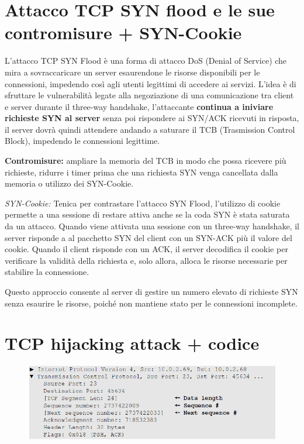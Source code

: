 \documentclass{report}
\begin{document}
\section{Attacco TCP SYN flood e le sue contromisure + SYN-Cookie}
\noindent L'attacco TCP SYN Flood è una forma di attacco DoS (Denial of Service) che mira a sovraccaricare un server esaurendone le risorse disponibili per le connessioni, impedendo così agli utenti legittimi di accedere ai servizi.
L'idea è di sfruttare le vulnerabilità legate alla negoziazione di una comunicazione tra client e server durante il three-way handshake, l'attaccante \textbf{continua a iniviare richieste SYN al server} senza poi rispondere ai SYN/ACK ricevuti in risposta,
il server dovrà quindi attendere andando a saturare il TCB (Trasmission Control Block), impedendo le connessioni legittime.

\noindent \textbf{Contromisure:} ampliare la memoria del TCB in modo che possa ricevere più richieste, ridurre i timer prima che una richiesta SYN venga cancellata dalla memoria o utilizzo dei SYN-Cookie.

\noindent \textit{SYN-Cookie:} Tenica per contrastare l'attacco SYN Flood, l'utilizzo di cookie permette a una sessione di restare attiva anche se la coda SYN è stata saturata da un attacco.
Quando viene attivata una sessione con un three-way handshake, il server risponde a al pacchetto SYN del client con un SYN-ACK più il valore del cookie.
Quando il client risponde con un ACK, il server decodifica il cookie per verificare la validità della richiesta e, solo allora, alloca le risorse necessarie per stabilire la connessione.

\noindent Questo approccio consente al server di gestire un numero elevato di richieste SYN senza esaurire le risorse, poiché non mantiene stato per le connessioni incomplete.

\section{TCP hijacking attack + codice}

\begin{figure}[H]
    \centering
    \includegraphics[width=1\linewidth]{images/codiceHijacking.png}
\end{figure}
\end{document}
